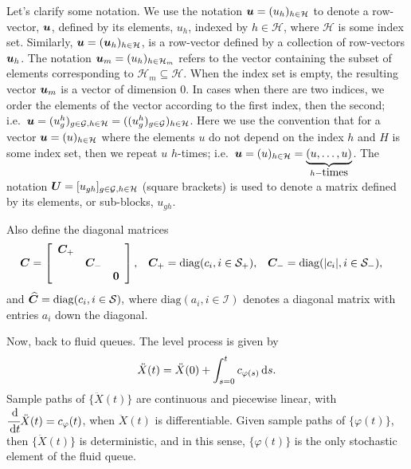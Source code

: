 {Let's clarify some notation. We use the notation \(\boldsymbol u = (u_h)_{h\in \mathcal H}\) to denote a row-vector, \(\boldsymbol u\), defined by its elements, \(u_h\), indexed by \(h\in\mathcal H\), where \(\mathcal H\) is some index set. Similarly, \(\boldsymbol u = (\boldsymbol u_h)_{h\in\mathcal H}\), is a row-vector defined by a collection of row-vectors \(\boldsymbol u_h\). The notation \(\boldsymbol u_m=(u_h)_{h\in\mathcal H_m}\) refers to the vector containing the subset of elements corresponding to \(\mathcal H_m\subseteq \mathcal H\). When the index set is empty, the resulting vector \(\boldsymbol u_m\) is a vector of dimension 0. In cases when there are two indices, we order the elements of the vector according to the first index, then the second; i.e.~\(\boldsymbol u = (u_{g}^h)_{g\in\mathcal G,h\in\mathcal H} = ((u_g^h)_{g\in\mathcal G})_{h\in\mathcal H}\). Here we use the convention that for a vector \(\boldsymbol u=(u)_{h\in \mathcal H}\) where the elements \(u\) do not depend on the index \(h\) and \(H\) is some index set, then we repeat \(u\) \(h\)-times; i.e.~\(\boldsymbol u = (u)_{h\in \mathcal H} =\underbrace{(u,\dots,u)}_{h-\mbox{times}}\). The notation \(\boldsymbol U = [u_{gh}]_{g\in\mathcal G, h\in\mathcal H}\) (square brackets) is used to denote a matrix defined by its elements, or sub-blocks, \(u_{gh}\).} 

Also define the diagonal matrices 
\begin{align*}
	\boldsymbol C &= \left[\begin{array}{ccc} \boldsymbol C_+ && \\ &\boldsymbol C_-& \\ && \boldsymbol 0\end{array}\right], && \boldsymbol C_+ = \mathrm{diag}(c_i,i\in\mathcal{S}_+), && \boldsymbol C_- = \mathrm{diag}(|c_i|,i\in\mathcal{S}_-),
\end{align*}
and 
\(
	\widehat{\boldsymbol C} = \mathrm{diag}(c_i,i\in\mathcal{S}),
\)
where \(\mathrm{diag}(a_i,i\in\mathcal I)\) denotes a diagonal matrix with entries \(a_i\) down the diagonal. 

Now, back to fluid queues. The level process is given by 
\[\ddot X(t) = \ddot X(0) + \int_{s=0}^t c_{\varphi(s)}\, \mathrm{d} s.\]
Sample paths of \(\{\ddot X (t)\}\) are continuous and piecewise linear, with \(\cfrac{\, \mathrm{d} }{\, \mathrm{d} t} \ddot X(t) = c_\varphi(t)\), when \(\ddot X(t)\) is differentiable. Given sample paths of \(\{\varphi(t)\}\), then \(\{\ddot X(t)\}\) is deterministic, and in this sense, \(\{\varphi(t)\}\) is the only stochastic element of the fluid queue. 

